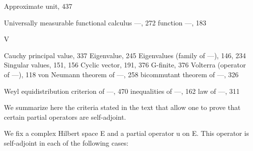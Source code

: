 Approximate unit, 437

Universally measurable functional calculus ---, 272 function ---, 183

V

Cauchy principal value, 337 Eigenvalue, 245 Eigenvalues (family of ---), 146,
234
Singular values, 151, 156 Cyclic vector, 191, 376 G-finite, 376 Volterra (operator of ---), 118 von Neumann theorem of ---, 258 bicommutant theorem of ---,
326

Weyl equidistribution criterion of ---, 470 inequalities of ---, 162 law of ---, 311


We summarize here the criteria stated in the text that allow one to prove that certain partial operators are self-adjoint.

We fix a complex Hilbert space E and a partial operator u on E. This operator is self-adjoint in each of the following cases:

